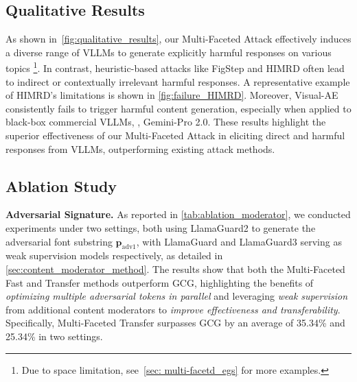 \subsection{Qualitative Results}\vspace{-3pt}
As shown in~\cref{fig:qualitative_results}, our Multi-Faceted Attack effectively induces a diverse range of VLLMs to generate explicitly harmful responses on various topics \footnote{Due to space limitation, see~\cref{sec: multi-facetd_egs} for more examples.}. In contrast, heuristic-based attacks like FigStep and HIMRD often lead to indirect or contextually irrelevant harmful responses. A representative example of HIMRD’s limitations is shown in \cref{fig:failure_HIMRD}. Moreover, Visual-AE consistently fails to trigger harmful content generation, especially when applied to black-box commercial VLLMs, \eg, Gemini-Pro 2.0. These results highlight the superior effectiveness of our Multi-Faceted Attack in eliciting direct and harmful responses from VLLMs, outperforming existing attack methods.





\subsection{Ablation Study}\vspace{-3pt}


\noindent \textbf{Adversarial Signature.} As reported in \cref{tab:ablation_moderator}, we conducted experiments under two settings, both using LlamaGuard2 to generate the adversarial font substring $\mathbf{p}_{\text{adv1}}$, with LlamaGuard and LlamaGuard3 serving as weak supervision models respectively, as detailed in \cref{sec:content_moderator_method}. The results show that both the Multi-Faceted Fast and Transfer methods outperform GCG, highlighting the benefits of \textit{optimizing multiple adversarial tokens in parallel} and leveraging \textit{weak supervision} from additional content moderators to \textit{improve effectiveness and transferability}. Specifically, Multi-Faceted Transfer surpasses GCG by an average of 35.34\% and 25.34\% in two settings. 


